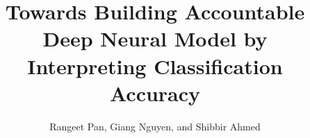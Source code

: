 \documentclass{llncs}
\begin{document}
\title{Towards Building Accountable Deep Neural Model by Interpreting Classification Accuracy}
\author{Rangeet Pan, Giang Nguyen, and Shibbir Ahmed}

%



\maketitle

\begin{abstract}

\end{abstract}

 






 
%
%



  
\end{document}
